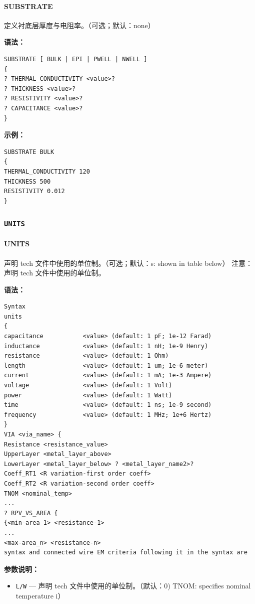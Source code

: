 \paragraph*{SUBSTRATE}

定义衬底层厚度与电阻率。（可选；默认：none）

\textbf{语法：}
\begin{lstlisting}
SUBSTRATE [ BULK | EPI | PWELL | NWELL ]
{
? THERMAL_CONDUCTIVITY <value>?
? THICKNESS <value>?
? RESISTIVITY <value>?
? CAPACITANCE <value>?
}
\end{lstlisting}

\textbf{示例：}
\begin{lstlisting}
SUBSTRATE BULK
{
THERMAL_CONDUCTIVITY 120
THICKNESS 500
RESISTIVITY 0.012
}
\end{lstlisting}

\subsubsection{\texttt{UNITS}}
\paragraph*{UNITS}

声明 tech 文件中使用的单位制。（可选；默认：s: shown in table below） 注意：声明 tech 文件中使用的单位制。

\textbf{语法：}
\begin{lstlisting}
Syntax
units
{
capacitance           <value> (default: 1 pF; 1e-12 Farad)
inductance            <value> (default: 1 nH; 1e-9 Henry)
resistance            <value> (default: 1 Ohm)
length                <value> (default: 1 um; 1e-6 meter)
current               <value> (default: 1 mA; 1e-3 Ampere)
voltage               <value> (default: 1 Volt)
power                 <value> (default: 1 Watt)
time                  <value> (default: 1 ns; 1e-9 second)
frequency             <value> (default: 1 MHz; 1e+6 Hertz)
}
VIA <via_name> {
Resistance <resistance_value>
UpperLayer <metal_layer_above>
LowerLayer <metal_layer_below> ? <metal_layer_name2>?
Coeff_RT1 <R variation-first order coeff>
Coeff_RT2 <R variation-second order coeff>
TNOM <nominal_temp>
...
? RPV_VS_AREA {
{<min-area_1> <resistance-1>
...
<max-area_n> <resistance-n>
syntax and connected wire EM criteria following it in the syntax are
\end{lstlisting}

\textbf{参数说明：}
\begin{itemize}
\item \texttt{L/W} — 声明 tech 文件中使用的单位制。（默认：0) TNOM: specifies nominal temperature i）
\end{itemize}

